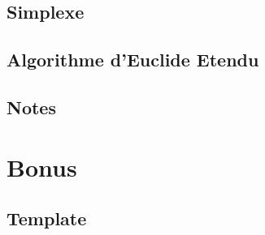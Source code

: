 \documentclass[10pt]{extarticle}
\begin{document}
\subsection{Simplexe}
{\scriptsize}
 
\subsection{Algorithme d'Euclide Etendu}
{\scriptsize}



\subsection{Notes}



\section{Bonus}
\subsection{Template}
{\scriptsize}
\end{document}

